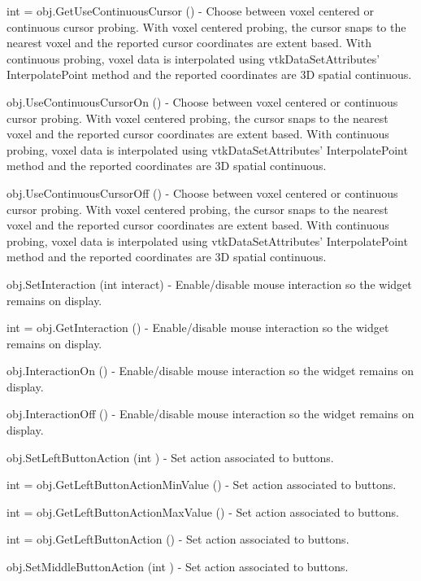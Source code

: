 \begin{DoxyItemize}
\item {\ttfamily int = obj.\-Get\-Use\-Continuous\-Cursor ()} -\/ Choose between voxel centered or continuous cursor probing. With voxel centered probing, the cursor snaps to the nearest voxel and the reported cursor coordinates are extent based. With continuous probing, voxel data is interpolated using vtk\-Data\-Set\-Attributes' Interpolate\-Point method and the reported coordinates are 3\-D spatial continuous.  
\item {\ttfamily obj.\-Use\-Continuous\-Cursor\-On ()} -\/ Choose between voxel centered or continuous cursor probing. With voxel centered probing, the cursor snaps to the nearest voxel and the reported cursor coordinates are extent based. With continuous probing, voxel data is interpolated using vtk\-Data\-Set\-Attributes' Interpolate\-Point method and the reported coordinates are 3\-D spatial continuous.  
\item {\ttfamily obj.\-Use\-Continuous\-Cursor\-Off ()} -\/ Choose between voxel centered or continuous cursor probing. With voxel centered probing, the cursor snaps to the nearest voxel and the reported cursor coordinates are extent based. With continuous probing, voxel data is interpolated using vtk\-Data\-Set\-Attributes' Interpolate\-Point method and the reported coordinates are 3\-D spatial continuous.  
\item {\ttfamily obj.\-Set\-Interaction (int interact)} -\/ Enable/disable mouse interaction so the widget remains on display.  
\item {\ttfamily int = obj.\-Get\-Interaction ()} -\/ Enable/disable mouse interaction so the widget remains on display.  
\item {\ttfamily obj.\-Interaction\-On ()} -\/ Enable/disable mouse interaction so the widget remains on display.  
\item {\ttfamily obj.\-Interaction\-Off ()} -\/ Enable/disable mouse interaction so the widget remains on display.  
\item {\ttfamily obj.\-Set\-Left\-Button\-Action (int )} -\/ Set action associated to buttons.  
\item {\ttfamily int = obj.\-Get\-Left\-Button\-Action\-Min\-Value ()} -\/ Set action associated to buttons.  
\item {\ttfamily int = obj.\-Get\-Left\-Button\-Action\-Max\-Value ()} -\/ Set action associated to buttons.  
\item {\ttfamily int = obj.\-Get\-Left\-Button\-Action ()} -\/ Set action associated to buttons.  
\item {\ttfamily obj.\-Set\-Middle\-Button\-Action (int )} -\/ Set action associated to buttons.  

\end{DoxyItemize}

